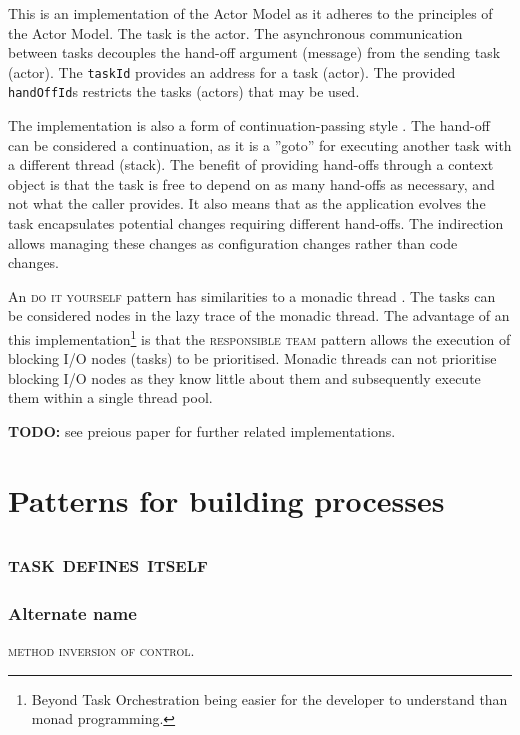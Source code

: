 \documentclass[prodmode]{style/acmlarge}
\begin{document}
This is an implementation of the Actor Model \cite{actors} as it adheres
to the principles of the Actor Model.  The task is the actor.  The asynchronous
communication between tasks decouples the hand-off argument (message) from the
sending task (actor).  The \texttt{taskId} provides an address for a task
(actor).  The provided \texttt{handOffId}s restricts the tasks (actors) that may
be used.

The implementation is also a form of continuation-passing style
\cite{continuations}.  The hand-off can be considered a continuation, as it is a
''goto'' for executing another task with a different thread (stack).  The benefit
of providing hand-offs through a context object is that the task is free to
depend on as many hand-offs as necessary, and not what the caller provides.  It
also means that as the application evolves the task encapsulates potential
changes requiring different hand-offs.  The indirection allows managing these
changes as configuration changes rather than code changes.

An \textsc{do it yourself} pattern has similarities to a monadic thread
\cite{monadic-thread}.  The tasks can be considered nodes in the lazy trace of
the monadic thread.  The advantage of an this implementation\footnote{Beyond
Task Orchestration being easier for the developer to understand than monad
programming.} is that the \textsc{responsible team} pattern allows the execution
of blocking I/O nodes (tasks) to be prioritised.  Monadic threads can not
prioritise blocking I/O nodes as they know little about them and subsequently
execute them within a single thread pool.

\textbf{TODO:} see preious paper for further related implementations.



\section{Patterns for building processes}


\subsection{\textsc{\textbf{task defines itself}}}

\subsubsection*{Alternate name} \textsc{method inversion of control}.
\end{document}
